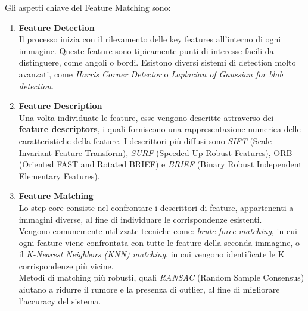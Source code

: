 \documentclass[12pt,a4paper,openright,twoside]{book}
\begin{document}
Gli aspetti chiave del Feature Matching sono:
\begin{enumerate}

\item \textbf{Feature Detection}\\
Il processo inizia con il rilevamento delle key features all'interno di ogni immagine. Queste feature sono tipicamente punti di interesse facili da distinguere, come angoli o bordi. Esistono diversi  sistemi di detection molto avanzati, come {\itshape Harris Corner Detector} o {\itshape Laplacian of Gaussian for blob detection}.

\item \textbf{Feature Description}\\
Una volta individuate le feature, esse vengono descritte attraverso dei \textbf{feature descriptors}, i quali forniscono una rappresentazione numerica delle caratteristiche della feature. I descrittori più diffusi sono {\itshape SIFT} (Scale-Invariant Feature Transform), {\itshape SURF} (Speeded Up Robust Features), ORB (Oriented FAST and Rotated BRIEF) e {\itshape BRIEF} (Binary Robust Independent Elementary Features).

\item \textbf{Feature Matching}\\
Lo step core consiste nel confrontare i descrittori di feature, appartenenti a immagini diverse, al fine di individuare le corrispondenze esistenti. \\
Vengono comunemente utilizzate tecniche come: {\itshape brute-force matching}, in cui ogni feature viene confrontata con tutte le feature della seconda immagine, o il  {\itshape K-Nearest Neighbors (KNN) matching}, in cui vengono identificate le K corrispondenze più vicine.\\
Metodi di matching più robusti, quali {\itshape RANSAC} (Random Sample Consensus) aiutano a ridurre il rumore e la presenza di outlier, al fine di migliorare l'accuracy del sistema.

\end{enumerate}
\end{document}
